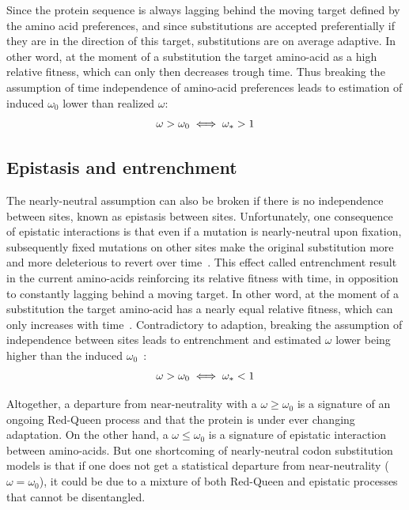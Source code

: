 Since the protein sequence is always lagging behind the moving target defined by the amino acid preferences, and since \glspl{substitution} are accepted preferentially if they are in the direction of this target, \glspl{substitution} are on average adaptive.
In other word, at the moment of a \gls{substitution} the target amino-acid as a high relative fitness, which can only then decreases trough time.
Thus breaking the assumption of time independence of amino-acid preferences leads to estimation of induced $\omega_0$ lower than realized $\omega$:
\begin{equation}
    \omega > \omega_0 \\
    \iff \omega_* > 1
\end{equation}

\subsection{Epistasis and entrenchment}
\label{subsec:epistasis-and-entrenchment}

The \gls{nearly-neutral} assumption can also be broken if there is no independence between sites, known as epistasis between sites.
Unfortunately, one consequence of epistatic interactions is that even if a mutation is \gls{nearly-neutral} upon fixation, subsequently fixed mutations on other sites make the original \gls{substitution} more and more deleterious to revert over time~\citep{Gong2014, Lunzer2010, Mccandlish2013}.
This effect called entrenchment result in the current amino-acids reinforcing its relative fitness with time, in opposition to constantly lagging behind a moving target.
In other word, at the moment of a \gls{substitution} the target amino-acid has a nearly equal relative fitness, which can only increases with time~\citep{Goldstein2016, Goldstein2017}.
Contradictory to adaption, breaking the assumption of independence between sites leads to entrenchment and estimated $\omega$ lower being higher than the induced $\omega_0$~\citep{Rodrigue2016}:
\begin{equation}
    \omega > \omega_0 \\
    \iff \omega_* < 1
\end{equation}

Altogether, a departure from near-neutrality with a $\omega \geq \omega_0$ is a signature of an ongoing Red-Queen process and that the protein is under ever changing adaptation.
On the other hand, a $\omega \leq \omega_0$ is a signature of epistatic interaction between amino-acids.
But one shortcoming of \gls{nearly-neutral} \gls{codon} \gls{substitution} models is that if one does not get a statistical departure from near-neutrality ($\omega = \omega_0$), it could be due to a mixture of both Red-Queen and epistatic processes that cannot be disentangled.